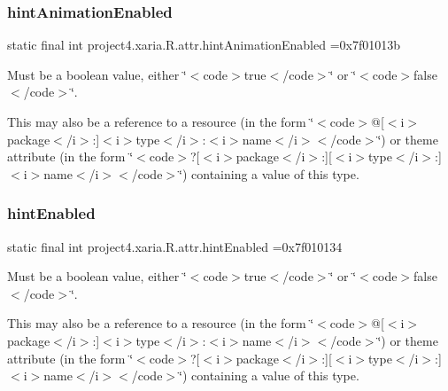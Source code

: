 \subsubsection{\texorpdfstring{hint\+Animation\+Enabled}{hintAnimationEnabled}}
{\footnotesize\ttfamily static final int project4.\+xaria.\+R.\+attr.\+hint\+Animation\+Enabled =0x7f01013b\hspace{0.3cm}{\ttfamily [static]}}

Must be a boolean value, either \char`\"{}$<$code$>$true$<$/code$>$\char`\"{} or \char`\"{}$<$code$>$false$<$/code$>$\char`\"{}. 

This may also be a reference to a resource (in the form \char`\"{}$<$code$>$@\mbox{[}$<$i$>$package$<$/i$>$\+:\mbox{]}$<$i$>$type$<$/i$>$\+:$<$i$>$name$<$/i$>$$<$/code$>$\char`\"{}) or theme attribute (in the form \char`\"{}$<$code$>$?\mbox{[}$<$i$>$package$<$/i$>$\+:\mbox{]}\mbox{[}$<$i$>$type$<$/i$>$\+:\mbox{]}$<$i$>$name$<$/i$>$$<$/code$>$\char`\"{}) containing a value of this type. \mbox{\label{classproject4_1_1xaria_1_1R_1_1attr_a5cf357c624a276e6002292a28873f633}} 
\subsubsection{\texorpdfstring{hint\+Enabled}{hintEnabled}}
{\footnotesize\ttfamily static final int project4.\+xaria.\+R.\+attr.\+hint\+Enabled =0x7f010134\hspace{0.3cm}{\ttfamily [static]}}

Must be a boolean value, either \char`\"{}$<$code$>$true$<$/code$>$\char`\"{} or \char`\"{}$<$code$>$false$<$/code$>$\char`\"{}. 

This may also be a reference to a resource (in the form \char`\"{}$<$code$>$@\mbox{[}$<$i$>$package$<$/i$>$\+:\mbox{]}$<$i$>$type$<$/i$>$\+:$<$i$>$name$<$/i$>$$<$/code$>$\char`\"{}) or theme attribute (in the form \char`\"{}$<$code$>$?\mbox{[}$<$i$>$package$<$/i$>$\+:\mbox{]}\mbox{[}$<$i$>$type$<$/i$>$\+:\mbox{]}$<$i$>$name$<$/i$>$$<$/code$>$\char`\"{}) containing a value of this type. \mbox{\label{classproject4_1_1xaria_1_1R_1_1attr_abf0ca0db0a3e46c1fde4474ba8f124eb}} 
